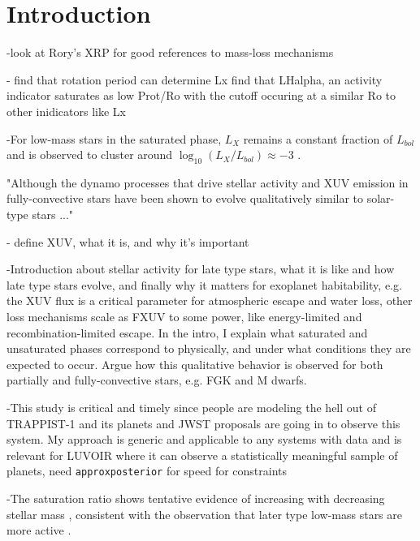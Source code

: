 \documentclass[twocolumn]{aastex62}
\newcommand{\approxposterior}[0]{\texttt{approxposterior}\xspace}
\begin{document}

\keywords{}


\section{Introduction} \label{sec:intro}

-look at Rory's XRP for good references to mass-loss mechanisms

-\citet{Reiners2014} find that rotation period can determine Lx
\citet{Newton2017} find that LHalpha, an activity indicator saturates as low Prot/Ro with the cutoff occuring at a similar Ro to other inidicators like Lx

-For low-mass stars in the saturated phase, $L_{X}$ remains a constant fraction of $L_{bol}$ and is observed to cluster around $\log_{10}(L_X/L_{bol}) \approx -3$ \citep{Pizzolato2003,Wright2011,Wright2018}. 

"Although the dynamo processes that drive stellar activity and XUV emission in fully-convective stars have been shown to evolve qualitatively similar to solar-type stars \citep{Wright2016,Wright2018} ..."

- define XUV, what it is, and why it's important

-Introduction about stellar activity for late type stars, what it is like and how late type stars evolve, and finally why it matters for exoplanet habitability, e.g. the XUV flux is a critical parameter for atmospheric escape and water loss, other loss mechanisms scale as FXUV to some power, like energy-limited and recombination-limited escape. In the intro, I explain what saturated and unsaturated phases correspond to physically, and under what conditions they are expected to occur. Argue how this qualitative behavior is observed for both partially and fully-convective stars, e.g. FGK and M dwarfs.

-This study is critical and timely since people are modeling the hell out of TRAPPIST-1 and its planets and JWST proposals are going in to observe this system. My approach is generic and applicable to any systems with data and is relevant for LUVOIR where it can observe a statistically meaningful sample of planets, need \approxposterior for speed for constraints

-The saturation ratio shows tentative evidence of increasing with decreasing stellar mass \citep{Wright2011,Jackson2012}, consistent with the observation that later type low-mass stars are more active \citep[e.g.][]{West2008}. 
\end{document}
